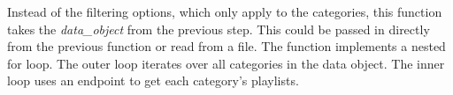 Instead of the filtering options, which only apply to the categories, this function takes the \emph{data\_object} from the
previous step. This could be passed in directly from the previous function or read from a file.
The function implements a nested for loop. The outer loop iterates over all categories in the data object.
The inner loop uses an endpoint to get each category's playlists.
%

